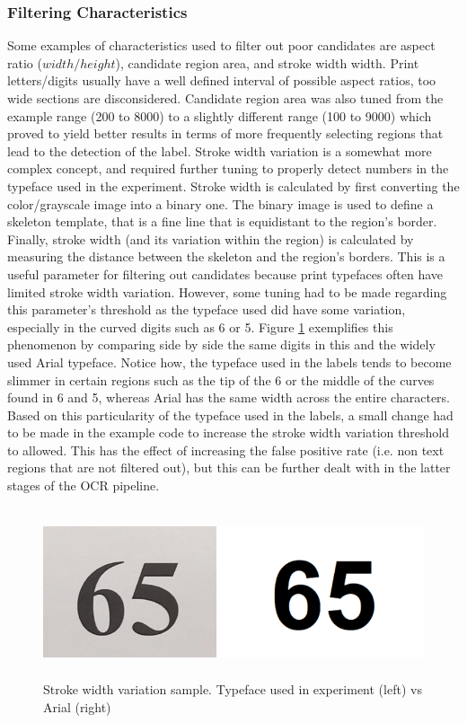 \documentclass[11pt]{article}
\begin{document}
    \subsubsection{Filtering Characteristics}
        Some examples of characteristics used to filter out poor candidates are aspect ratio ($width / height$), candidate region area, and stroke width width. Print letters/digits usually have a well defined interval of possible aspect ratios, too wide sections are disconsidered. Candidate region area was also tuned from the example range (200 to 8000) to a slightly different range (100 to 9000) which proved to yield better results in terms of more frequently selecting regions that lead to the detection of the label. Stroke width variation is a somewhat more complex concept, and required further tuning to properly detect numbers in the typeface used in the experiment. Stroke width is calculated by first converting the color/grayscale image into a binary one. The binary image is used to define a skeleton template, that is a fine line that is equidistant to the region's border. Finally, stroke width (and its variation within the region) is calculated by measuring the distance between the skeleton and the region's borders. This is a useful parameter for filtering out candidates because print typefaces often have limited stroke width variation. However, some tuning had to be made regarding this parameter's threshold as the typeface used did have some variation, especially in the curved digits such as 6 or 5. Figure \ref{fig:ocr:stroke} exemplifies this phenomenon by comparing side by side the same digits in this and the widely used Arial typeface. Notice how, the typeface used in the labels tends to become slimmer in certain regions such as the tip of the 6 or the middle of the curves found in 6 and 5, whereas Arial has the same width across the entire characters. Based on this particularity of the typeface used in the labels, a small change had to be made in the example code to increase the stroke width variation threshold to allowed. This has the effect of increasing the false positive rate (i.e. non text regions that are not filtered out), but this can be further dealt with in the latter stages of the OCR pipeline.
        \begin{figure}[h]
            \centering
            \includegraphics[height=5cm]{./Images/ocr/stroke.png}
            \caption{Stroke width variation sample. Typeface used in experiment (left) vs Arial (right)}
            \label{fig:ocr:stroke}
        \end{figure}
\end{document}

